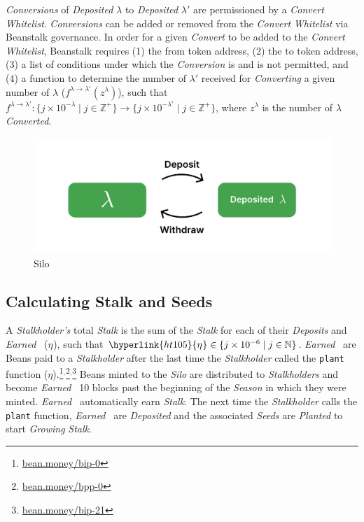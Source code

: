 \documentclass[tikz]{article}
\newcommand{\code}[1]{\texttt{#1}}
\newcommand{\term}[1]{\textsl{#1}}
\newcommand{\Bean}{} %
\newcommand{\bean}{} %
\begin{document}
\term{Conversions} of \term{Deposited} \hyperlink{ht126}{$\lambda$} to \term{Deposited} $\lambda'$ are permissioned by a \term{Convert} \term{Whitelist}. \term{Conversions} can be added or removed from the \term{Convert} \term{Whitelist} via Beanstalk governance. In order for a given \term{Convert} to be added to the \term{Convert} \term{Whitelist}, Beanstalk requires (1) the from token address, (2) the to token address, (3) a list of conditions under which the \term{Conversion} is and is not permitted, and (4) a function to determine the number of $\lambda'$ received for \term{Converting} a given number of \hyperlink{ht126}{$\lambda$} ($f^{\lambda \rightarrow \lambda'}(z^{\lambda})$), such that $f^{\lambda \rightarrow \lambda'}\colon \{j \times 10^{-\lambda} \mid j \in \mathbb{Z}^{+} \} \rightarrow \{j \times 10^{-\lambda'} \mid j \in \mathbb{Z}^{+} \}$, where $z^{\lambda}$ is the number of \hyperlink{ht126}{\hyperlink{ht126}{$\lambda$}} \term{Converted}. 

\begin{figure}[h!]
    \centering
    \includegraphics[scale=.16]{Figure1}
    \vspace*{-5mm}
    \caption{Silo}
    \label{fig 1}
\end{figure}

\vspace*{-1mm}
\subsection{Calculating Stalk and Seeds}
\vspace*{-1mm}
A \term{Stalkholder's} total \term{Stalk} is the sum of the \term{Stalk} for each of their \term{Deposits} and \term{Earned} \Bean\ (\hyperlink{ht105}{$\eta^{\bean}$}), such that $\hyperlink{ht105}{\eta^{\bean}} \in \{j \times 10^{-6} \mid j \in \mathbb{N} \}$. 
\term{Earned} \Bean\ are Beans paid to a \term{Stalkholder} after the last time the \term{Stalkholder} called the \code{plant} function (\hyperlink{ht104}{$\eta$}).\footnote{\href{https://bean.money/bip-0}{bean.money/bip-0}}$^{,}$\footnote{\href{https://bean.money/bpp-0}{bean.money/bpp-0}}$^{,}$\footnote{\href{https://bean.money/bip-21}{bean.money/bip-21}} Beans minted to the \term{Silo} are distributed to \term{Stalkholders} and become \term{Earned} \Bean\ 10 blocks past the beginning of the \term{Season} in which they were minted. \term{Earned} \Bean\ automatically earn \term{Stalk}. The next time the \term{Stalkholder} calls the \code{plant} function, \term{Earned} \Bean\ are \term{Deposited} and the associated \term{Seeds} are \term{Planted} to start \term{Growing} \term{Stalk}.
\end{document}
